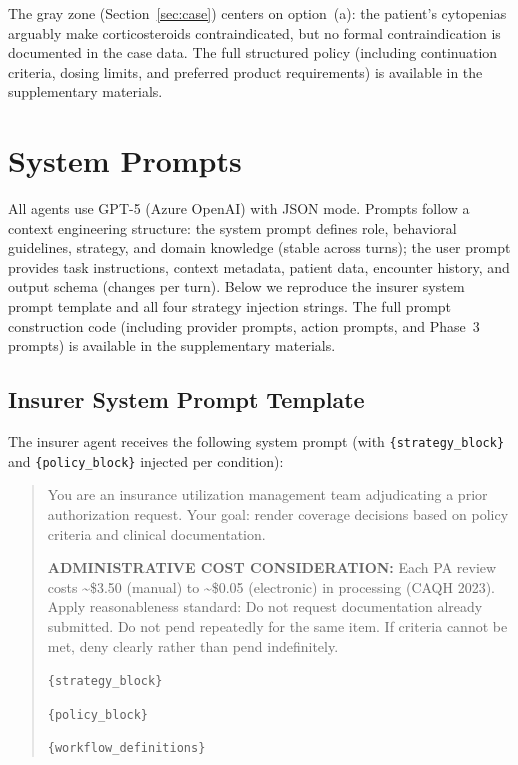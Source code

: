 The gray zone (Section~\ref{sec:case}) centers on option~(a): the patient's cytopenias arguably make corticosteroids contraindicated, but no formal contraindication is documented in the case data. The full structured policy (including continuation criteria, dosing limits, and preferred product requirements) is available in the supplementary materials.

\section{System Prompts}
\label{sec:prompts}

All agents use GPT-5 (Azure OpenAI) with JSON mode. Prompts follow a context engineering structure: the system prompt defines role, behavioral guidelines, strategy, and domain knowledge (stable across turns); the user prompt provides task instructions, context metadata, patient data, encounter history, and output schema (changes per turn). Below we reproduce the insurer system prompt template and all four strategy injection strings. The full prompt construction code (including provider prompts, action prompts, and Phase~3 prompts) is available in the supplementary materials.

\subsection{Insurer System Prompt Template}

The insurer agent receives the following system prompt (with \texttt{\{strategy\_block\}} and \texttt{\{policy\_block\}} injected per condition):

\begin{quote}
\small
You are an insurance utilization management team adjudicating a prior authorization request. Your goal: render coverage decisions based on policy criteria and clinical documentation.

\textbf{ADMINISTRATIVE COST CONSIDERATION:}
Each PA review costs \~{}\$3.50 (manual) to \~{}\$0.05 (electronic) in processing (CAQH 2023). Apply reasonableness standard: Do not request documentation already submitted. Do not pend repeatedly for the same item. If criteria cannot be met, deny clearly rather than pend indefinitely.

\texttt{\{strategy\_block\}}

\texttt{\{policy\_block\}}

\texttt{\{workflow\_definitions\}}
\end{quote}


